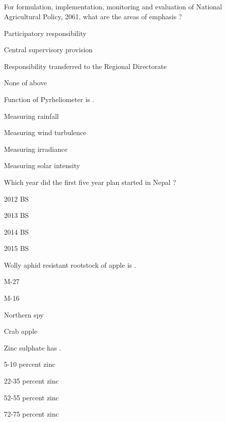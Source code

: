 
\subsection*{}

\begin{questions}

\question For formulation, implementation, monitoring and evaluation of National Agricultural Policy, 2061, what are the areas of emphasis ?
\begin{items}
\item* Participatory responsibility
\item Central supervisory provision
\item Responsibility transferred to the Regional Directorate
\item None of above
\end{items}

\question Function of Pyrheliometer is \fillin[][3cm].
\begin{items}
\item Measuring rainfall
\item Measuring wind turbulence
\item* Measuring irradiance
\item Measuring solar intensity
\end{items}

\question Which year did the first five year plan started in Nepal ?
\begin{items}
\item 2012 BS
\item* 2013 BS
\item 2014 BS
\item 2015 BS
\end{items}

\question Wolly aphid resistant rootstock of apple is \fillin[][3cm].
\begin{items}
\item M-27
\item M-16
\item* Northern spy
\item Crab apple
\end{items}

\question Zinc sulphate has \fillin[][3cm].
\begin{items}
\item 5-10 percent zinc
\item* 22-35 percent zinc
\item 52-55 percent zinc
\item 72-75 percent zinc
\end{items}


\end{questions}
